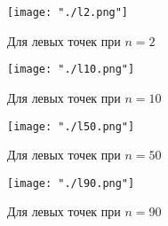 \documentclass[a5paper, 10pt]{article}
\theoremstyle{definition}
\theoremstyle{plain}
\theoremstyle{remark}
\begin{document}
\begin{figure}
		\begin{center}
                      \texttt{[image: "./l2.png"]}
	           \caption{Для левых точек при $n=2$}
		\end{center}
	\end{figure}
\begin{figure}
		\begin{center}
                      \texttt{[image: "./l10.png"]}
	           \caption{Для левых точек при $n=10$}
		\end{center}
	\end{figure}
\begin{figure}
		\begin{center}
                      \texttt{[image: "./l50.png"]}
	           \caption{Для левых точек при $n=50$}
		\end{center}
	\end{figure}
\begin{figure}
		\begin{center}
                      \texttt{[image: "./l90.png"]}
	           \caption{Для левых точек при $n=90$}
		\end{center}
	\end{figure}
\end{document}
